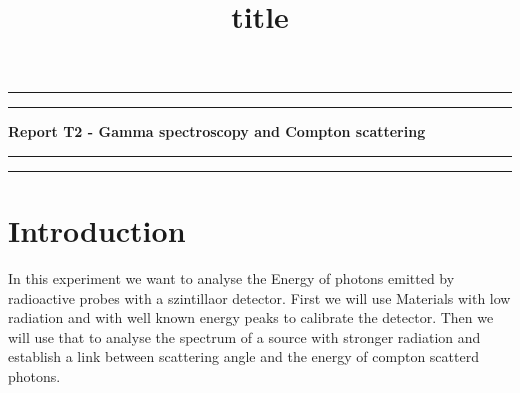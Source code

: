 \documentclass[a4paper,12pt]{article}
\title{\LARGE title}
\date{}
\newcommand{\Thickline}{\rule{\linewidth}{0.4mm}}
\newcommand{\Thinline}{\rule{\linewidth}{0.1mm}}
\newcommand{\skippage}{\clearpage{\thispagestyle{empty}\cleardoublepage}}
\begin{document}
	
\begin{titlepage}
	\thispagestyle{empty}
	
%
%
%
	
	\vspace{3cm}
	\begin{center}
		\Thickline
		\vskip -0.45cm
		\Thinline
		\vspace{0.5cm}
		
		\huge{ \textbf{ Report T2 - Gamma spectroscopy and Compton scattering } } 
		
		\Thinline
		\vskip -1cm
		\Thickline 
		\vspace{1cm}

		
	\end{center}
	\vfill
	
\end{titlepage}
	
	
	
\skippage
{}
\thispagestyle{plain}

\tableofcontents
\listoffigures

\begingroup
\let\cleardoublepage\relax
\let\clearpage\relax
\listoftables
\endgroup

\skippage

\setcounter{page}{1}
\restoregeometry
\thispagestyle{fancy}


\skippage
	
\section{Introduction}
In this experiment we want to analyse the Energy of photons emitted by radioactive probes with a szintillaor detector. First we will use Materials with low radiation and with well known energy peaks to calibrate the detector. Then we will use that to analyse the spectrum of a source with stronger radiation and establish a link between scattering angle and the energy of compton scatterd photons. 
\end{document}
